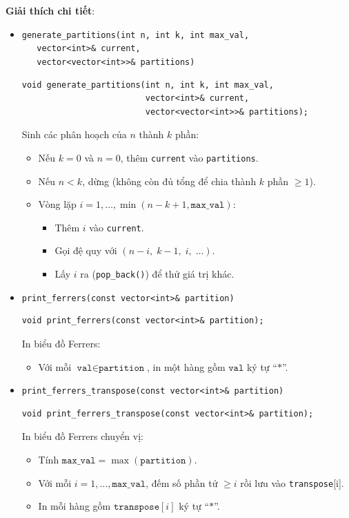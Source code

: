 \documentclass[a4paper,12pt]{article}
\begin{document}
\textbf{Giải thích chi tiết}:
\begin{itemize}

  \item \texttt{generate\_partitions(int n, int k, int max\_val,\\
        \ \ \ vector<int>\& current,\\
        \ \ \ vector<vector<int>>\& partitions)}  

    \begin{lstlisting}[style=cppstyle]
void generate_partitions(int n, int k, int max_val,
                         vector<int>& current,
                         vector<vector<int>>& partitions);
    \end{lstlisting}

    Sinh các phân hoạch của \(n\) thành \(k\) phần:
    \begin{itemize}
      \item Nếu \(k=0\) và \(n=0\), thêm \texttt{current} vào \texttt{partitions}.
      \item Nếu \(n<k\), dừng (không còn đủ tổng để chia thành \(k\) phần \(\ge1\)).
      \item Vòng lặp \(i=1,\dots,\min(n-k+1,\texttt{max\_val})\):
        \begin{itemize}
          \item Thêm \(i\) vào \texttt{current}.
          \item Gọi đệ quy với \((n-i,\;k-1,\;i,\;\dots)\).
          \item Lấy \(i\) ra (\texttt{pop\_back()}) để thử giá trị khác.
        \end{itemize}
    \end{itemize}

  \item \texttt{print\_ferrers(const vector<int>\& partition)}  
    \begin{lstlisting}[style=cppstyle]
void print_ferrers(const vector<int>& partition);
    \end{lstlisting}
    In biểu đồ Ferrers:
    \begin{itemize}
      \item Với mỗi \(\texttt{val}\in\texttt{partition}\), in một hàng gồm \(\texttt{val}\) ký tự “\(\ast\)”.
    \end{itemize}

  \item \texttt{print\_ferrers\_transpose(const vector<int>\& partition)}  
    \begin{lstlisting}[style=cppstyle]
void print_ferrers_transpose(const vector<int>& partition);
    \end{lstlisting}
    In biểu đồ Ferrers chuyển vị:
    \begin{itemize}
      \item Tính \(\texttt{max\_val}=\max(\texttt{partition})\).
      \item Với mỗi \(i=1,\dots,\texttt{max\_val}\), đếm số phần tử \(\ge i\) rồi lưu vào \texttt{transpose}[i].
      \item In mỗi hàng gồm \(\texttt{transpose}[i]\) ký tự “\(\ast\)”.
    \end{itemize}


\end{itemize}
\end{document}
